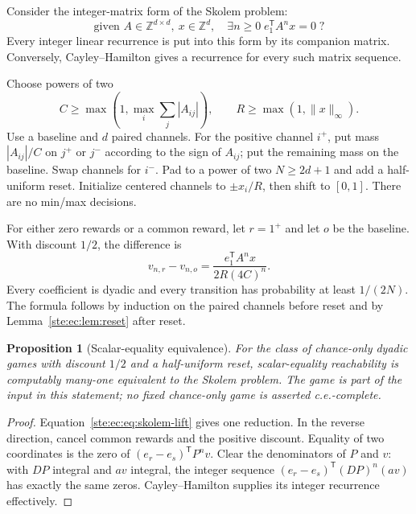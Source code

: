 \documentclass[11pt,letterpaper]{article}
\newtheorem{proposition}[theorem]{Proposition}
\theoremstyle{definition}
\theoremstyle{remark}
\newcommand{\Z}{\mathbb Z}
\begin{document}
Consider the integer-matrix form of the Skolem problem:
\begin{equation}
 \text{given }A\in\Z^{d\times d},\ x\in\Z^d,
 \quad \exists n\geq0\; e_1^{\mathsf T}A^nx=0\;?
 \label{ste:ec:eq:skolem}
\end{equation}
Every integer linear recurrence is put into this form by its companion
matrix. Conversely, Cayley--Hamilton gives a recurrence for every such
matrix sequence.

Choose powers of two
\[
 C\geq\max\left(1,\max_i\sum_j|A_{ij}|\right),\qquad
 R\geq\max(1,\|x\|_\infty).
\]
Use a baseline and $d$ paired channels. For the positive channel $i^+$,
put mass $|A_{ij}|/C$ on $j^+$ or $j^-$ according to the sign of $A_{ij}$;
put the remaining mass on the baseline. Swap channels for $i^-$. Pad
to a power of two $N\geq2d+1$ and add a half-uniform reset.
Initialize centered channels to $\pm x_i/R$, then shift to $[0,1]$.
There are no min/max decisions.

For either zero rewards or a common reward, let $r=1^+$ and let $o$ be
the baseline. With discount $1/2$, the difference is
\begin{equation}
 v_{n,r}-v_{n,o}
 =\frac{e_1^{\mathsf T}A^nx}{2R(4C)^n}.
 \label{ste:ec:eq:skolem-lift}
\end{equation}
Every coefficient is dyadic and every transition has probability at least
$1/(2N)$. The formula follows by induction on the paired channels before
reset and by Lemma~\ref{ste:ec:lem:reset} after reset.

\begin{proposition}[Scalar-equality equivalence]
\label{ste:ec:prop:skolem}
For the class of chance-only dyadic games with discount $1/2$ and a
half-uniform reset, scalar-equality reachability is computably many-one
equivalent to the Skolem problem. The game is part of the input in this
statement; no fixed chance-only game is asserted c.e.-complete.
\end{proposition}

\begin{proof}
Equation~\eqref{ste:ec:eq:skolem-lift} gives one reduction. In the reverse
direction, cancel common rewards and the positive discount. Equality of
two coordinates is the zero of
$(e_r-e_s)^{\mathsf T}P^nv$. Clear the denominators of $P$ and $v$:
with $D P$ integral and $a v$ integral, the integer sequence
$(e_r-e_s)^{\mathsf T}(DP)^n(av)$ has exactly the same zeros.
Cayley--Hamilton supplies its integer recurrence effectively.
\end{proof}
\end{document}
